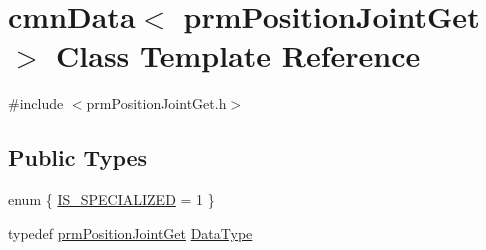 \hypertarget{classcmn_data_3_01prm_position_joint_get_01_4}{\section{cmn\-Data$<$ prm\-Position\-Joint\-Get $>$ Class Template Reference}
\label{classcmn_data_3_01prm_position_joint_get_01_4}
}


{\ttfamily \#include $<$prm\-Position\-Joint\-Get.\-h$>$}

\subsection*{Public Types}
\begin{DoxyCompactItemize}
\item 
enum \{ \hyperlink{classcmn_data_3_01prm_position_joint_get_01_4_a30ba42b0f7d5080bd6ba023d8e3683b6a37a4f8b02ddb6a50af0983a7f4a813b1}{I\-S\-\_\-\-S\-P\-E\-C\-I\-A\-L\-I\-Z\-E\-D} = 1
 \}
\item 
typedef \hyperlink{classprm_position_joint_get}{prm\-Position\-Joint\-Get} \hyperlink{classcmn_data_3_01prm_position_joint_get_01_4_ade75e8432e51840dc4c2aa616544c2b6}{Data\-Type}
\end{DoxyCompactItemize}
